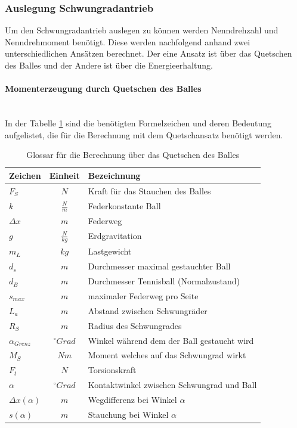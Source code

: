 \subsubsection{Auslegung Schwungradantrieb}
\label{BestimmungDrehmomentSchwundrad}
Um den Schwungradantrieb auslegen zu können werden Nenndrehzahl und Nenndrehmoment 
benötigt. Diese werden nachfolgend anhand zwei unterschiedlichen Ansätzen berechnet.
Der eine Ansatz ist über das Quetschen des Balles und der Andere ist über die 
Energieerhaltung.
%
\paragraph{Momenterzeugung durch Quetschen des Balles}$~~$\vspace{2mm}\\
In der Tabelle \ref{tab:glossarQuetschen} sind die benötigten Formelzeichen und 
deren Bedeutung aufgelistet, die für die Berechnung mit dem Quetschansatz benötigt 
werden.
\begin{table}[h!]
    \begin{tabular}{lcl}
        \rule{0pt}{11pt}Zeichen & Einheit & Bezeichnung \\
        \hline\rule{0pt}{11pt}$F_S$ & $N$ & Kraft für das Stauchen des Balles \\
        \rule{0pt}{11pt}$k$ & $\frac{N}{m}$ & Federkonstante Ball \\
        \rule{0pt}{11pt}$\Delta x$ & $m$ & Federweg \\
        \rule{0pt}{11pt}$g$ & $\frac{N}{kg}$ & Erdgravitation \\
        \rule{0pt}{11pt}$m_L$ & $kg$ & Lastgewicht \\
        \rule{0pt}{11pt}$d_s$ & $m$ & Durchmesser maximal gestauchter Ball \\
        \rule{0pt}{11pt}$d_B$ & $m$ & Durchmesser Tennisball (Normalzustand) \\
        \rule{0pt}{11pt}$s_{max}$ & $m$ & maximaler Federweg pro Seite \\
        \rule{0pt}{11pt}$L_a$ & $m$ & Abstand zwischen Schwungräder \\
        \rule{0pt}{11pt}$R_S$ & $m$ & Radius des Schwungrades \\
        \rule{0pt}{11pt}$\alpha_{Grenz}$ & $^\circ Grad$ & Winkel während dem der Ball gestaucht wird \\
        \rule{0pt}{11pt}$M_S$ & $Nm$ & Moment welches auf das Schwungrad wirkt \\
        \rule{0pt}{11pt}$F_t$ & $N$ & Torsionskraft \\
        \rule{0pt}{11pt}$\alpha$ & $^\circ Grad$ & Kontaktwinkel zwischen Schwungrad und Ball \\
        \rule{0pt}{11pt}$\Delta x(\alpha)$ & $m$ & Wegdifferenz bei Winkel $\alpha$ \\
        \rule{0pt}{11pt}$s(\alpha)$ & $m$ & Stauchung bei Winkel $\alpha$ \\
    \end{tabular}
        \centering
        \caption{Glossar für die Berechnung über das Quetschen des Balles}
        \label{tab:glossarQuetschen}
\end{table}


